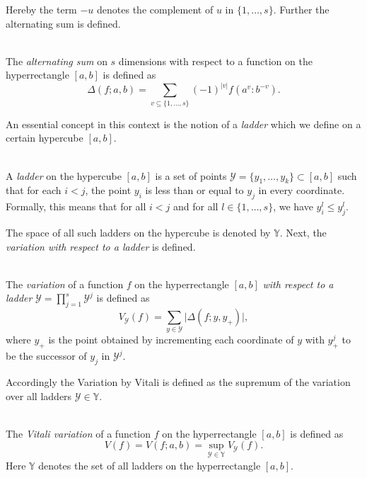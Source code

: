 Hereby the term $-u$ denotes the complement of $u$ in $\{1, \dots, s\}$. Further the alternating sum is defined.

\begin{definition} \ \\
    The \emph{alternating sum} on $s$ dimensions with respect to a function on
    the hyperrectangle $[a,b]$ is defined as
    \begin{equation*}
        \Delta(f; a, b) = \sum_{v \subseteq \{1,\dots,s\}} (-1)^{|v|} f(a^v:b^{-v}).
    \end{equation*}
\end{definition}

An essential concept in this context is the notion of a \emph{ladder} which we
define on a certain hypercube $[a,b]$.

\begin{definition}[Ladder] \ \\
    A \emph{ladder} on the hypercube $[a,b]$ is a set of points $\mathcal{Y} =
    \{y_1, \dots, y_k\} \subset [a,b]$ such that for each $i < j$, the point
    $y_i$ is less than or equal to $y_j$ in every coordinate. Formally, this
    means that for all $i < j$ and for all $l \in \{1, \dots, s\}$, we have
    $y_i^l \leq y_j^l$.
\end{definition}

The space of all such ladders on the hypercube is denoted by $\mathbb{Y}$. Next,
the \emph{variation with respect to a ladder} is defined.

\begin{definition} \ \\
    The \emph{variation} of a function $f$ on the hyperrectangle $[a,b]$
    \emph{with respect to a ladder}
    $\mathcal{Y} = \prod\limits_{j=1}^s \mathcal{Y}^j$ is defined as
    \begin{equation*}
        V_\mathcal{Y}(f) = \sum_{y \in \mathcal{Y}} \big| \Delta(f; y, y_+) \big|,
    \end{equation*}
    where $y_+$ is the point obtained by incrementing each coordinate of $y$
    with $y^j_+$ to be the successor of $y_j$ in $\mathcal{Y}^j$.
\end{definition}

Accordingly the Variation by Vitali is defined as the supremum of the variation
over all ladders $\mathcal{Y} \in \mathbb{Y}$.

\begin{definition} \ \\
    The \emph{Vitali variation} of a function $f$ on the hyperrectangle $[a,b]$ is defined as
    \begin{equation*}
        V(f) = V(f; a, b) = \sup_{\mathcal{Y} \in \mathbb{Y}} V_\mathcal{Y}(f).
    \end{equation*}
    Here $\mathbb{Y}$ denotes the set of all ladders on the hyperrectangle $[a,b]$.
\end{definition}

